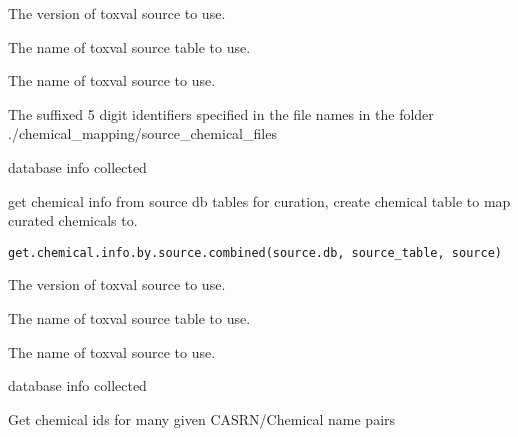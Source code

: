 \documentclass[letterpaper]{book}
\begin{document}
%
\begin{Arguments}
\begin{ldescription}
\item[\code{source.db}] The version of toxval source to use.

\item[\code{source\_table}] The name of toxval source table to use.

\item[\code{source}] The name of toxval source to use.

\item[\code{file\_id}] The suffixed 5 digit identifiers specified in the file names in the folder ./chemical\_mapping/source\_chemical\_files
\end{ldescription}
\end{Arguments}
%
\begin{Value}
database info collected
\end{Value}
%
\begin{Description}\relax
get chemical info from source db tables for curation, create
chemical table to map curated chemicals to.
\end{Description}
%
\begin{Usage}
\begin{verbatim}
get.chemical.info.by.source.combined(source.db, source_table, source)
\end{verbatim}
\end{Usage}
%
\begin{Arguments}
\begin{ldescription}
\item[\code{source.db}] The version of toxval source to use.

\item[\code{source\_table}] The name of toxval source table to use.

\item[\code{source}] The name of toxval source to use.
\end{ldescription}
\end{Arguments}
%
\begin{Value}
database info collected
\end{Value}
%
\begin{Description}\relax
Get chemical ids for many given CASRN/Chemical name pairs
\end{Description}
\end{document}
